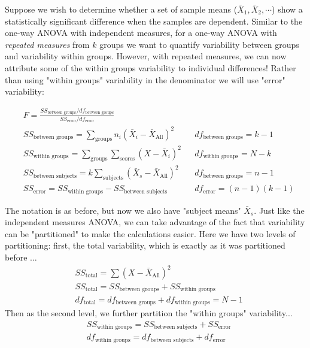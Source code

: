 \documentclass{tufte-handout}
\begin{document}
Suppose we wish to determine whether a set of sample means ($\bar{X}_1,\bar{X}_2,\cdots$) show a statistically significant difference when the samples are dependent. Similar to the one-way ANOVA with independent measures, for a one-way ANOVA with \emph{repeated measures} from $k$  groups we want to quantify variability between groups and variability within groups. However, with repeated measures, we can now attribute some of the within groups variability to individual differences! Rather than using "within groups" variability in the denominator we will use "error" variability:

\begin{align*}
&F=\frac{SS_{\text{between groups}}/df_{\text{between groups}}}{SS_{\text{error}}/df_{\text{error}}} & &\\
&SS_{\text{between groups}}=\sum_{\text{groups}} n_i(\bar{X}_i-\bar{X}_{\text{All}})^2 & &df_{\text{between groups}}=k-1\\
&SS_{\text{within groups}} =\sum_{\text{groups}} \sum_{\text{scores}} (X-\bar{X}_i)^2  & &df_{\text{within groups}}=N-k\\
&SS_{\text{between subjects}} = k \sum_{\text{subjects}} (\bar{X}_{s}-\bar{X}_{\text{All}})^2 & &df_{\text{between groups}}=n-1\\
&SS_{\text{error}} = SS_{\text{within groups}} - SS_{\text{between subjects}}& &df_{\text{error}}=(n-1)(k-1)
\end{align*}

The notation is as before, but now we also have "subject means" $\bar{X}_s$. Just like the independent measures ANOVA, we can take advantage of the fact that variability can be "partitioned" to make the calculations easier. Here we have two levels of partitioning: first, the total variability, which is exactly as it was partitioned before $\dots$
\begin{align*}
&SS_{\text{total}}=\sum (X-\bar{X}_{\text{All}})^2\\
&SS_{\text{total}}=SS_{\text{between groups}} + SS_{\text{within groups}}\\
&df_{\text{total}}=df_{\text{between groups}} + df_{\text{within groups}}=N-1
\end{align*}
Then as the second level, we further partition the "within groups" variability...
\begin{align*}
&SS_{\text{within groups}}=SS_{\text{between subjects}} + SS_{\text{error}}\\
&df_{\text{within groups}}=df_{\text{between subjects}} + df_{\text{error}}
\end{align*}
\end{document}
